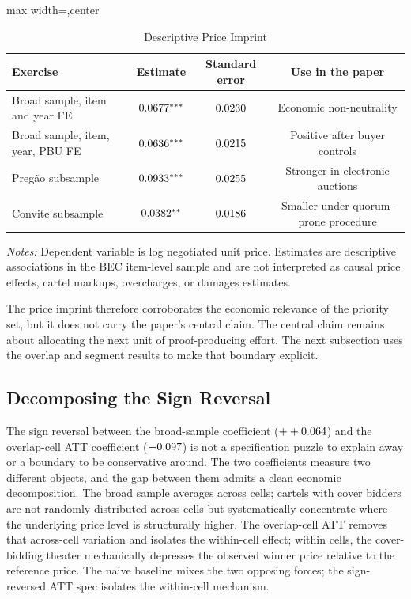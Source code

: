 \begin{table}[htbp]
\centering
\caption{Descriptive Price Imprint}
\label{tab:price_imprint_submission}
\footnotesize
\begin{adjustbox}{max width=\textwidth,center}
\begin{threeparttable}
\begin{tabular}{p{5.4cm}ccc}
\toprule
Exercise & Estimate & Standard error & Use in the paper \\
\midrule
Broad sample, item and year FE & $0.0677^{***}$ &
$0.0230$ & Economic non-neutrality \\
Broad sample, item, year, PBU FE & $0.0636^{***}$ &
$0.0215$ & Positive after buyer controls \\
Pregão subsample & $0.0933^{***}$ &
$0.0255$ & Stronger in electronic auctions \\
Convite subsample & $0.0382^{**}$ &
$0.0186$ & Smaller under quorum-prone procedure \\
\bottomrule
\end{tabular}
\begin{tablenotes}
\footnotesize
\item \textit{Notes:} Dependent variable is log negotiated unit
price. Estimates are descriptive associations in the BEC
item-level sample and are not interpreted as causal price
effects, cartel markups, overcharges, or damages estimates.
\end{tablenotes}
\end{threeparttable}
\end{adjustbox}
\end{table}

The price imprint therefore corroborates the economic relevance
of the priority set, but it does not carry the paper's central
claim. The central claim remains about allocating the next unit
of proof-producing effort. The next subsection uses the overlap
and segment results to make that boundary explicit.

\subsection{Decomposing the Sign Reversal}
\label{sec:price_scope_submission}

The sign reversal between the broad-sample coefficient
($++0.064$) and the overlap-cell ATT coefficient
($-0.097$) is not a specification puzzle to
explain away or a boundary to be conservative around. The two
coefficients measure two different objects, and the gap between
them admits a clean economic decomposition. The broad sample
averages across cells; cartels with cover bidders are not
randomly distributed across cells but systematically concentrate
where the underlying price level is structurally higher. The
overlap-cell ATT removes that across-cell variation and isolates
the within-cell effect; within cells, the cover-bidding theater
mechanically depresses the observed winner price relative to the
reference price. The naive baseline mixes the two opposing
forces; the sign-reversed ATT spec isolates the within-cell
mechanism.

